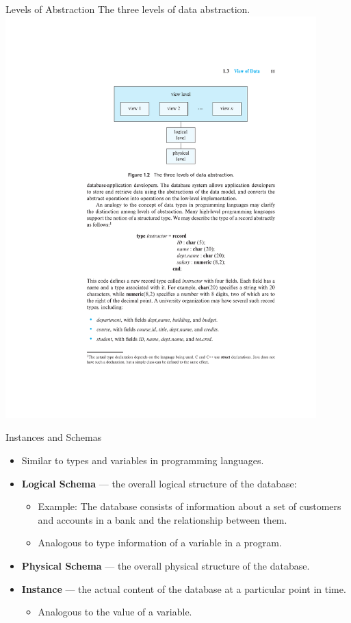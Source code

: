\documentclass{beamer}
\begin{document}
\begin{frame}{Levels of Abstraction}
    The three levels of data abstraction.
    \centering 
    \includegraphics[width=0.9\textwidth, trim={7.25cm 17.5cm 4.75cm 4cm}, clip]{figures/arch}
\end{frame}

\begin{frame}{Instances and Schemas}
    \begin{itemize}
        \item Similar to types and variables in programming languages.
        \item \textbf{Logical Schema} --- the overall logical structure of the database:
        \begin{itemize}
            \item Example: The database consists of information about a set of customers and accounts in a bank and the relationship between them.
            \item Analogous to type information of a variable in a program.
        \end{itemize}
        \item \textbf{Physical Schema} --- the overall physical structure of the database.
        \item \textbf{Instance} --- the actual content of the database at a particular point in time.
        \begin{itemize}
            \item Analogous to the value of a variable.
        \end{itemize}
    \end{itemize}
\end{frame}
\end{document}
